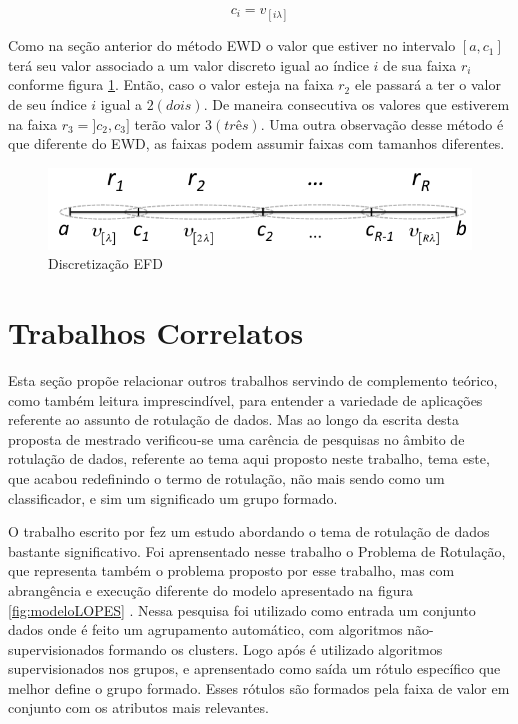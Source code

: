 \begin{equation}
c_i = v_{[i\lambda]}
 \label{eq:pontocorteEFD}
\end{equation}

Como na seção anterior do método EWD o valor que estiver no intervalo ${[a,c_1]}$ terá seu valor associado a um valor discreto igual ao índice ${i}$ de sua faixa ${r_i}$ conforme figura \ref{fig:faixasEFD}. Então, caso o valor esteja na faixa ${r_2}$ ele passará a ter o valor de seu índice ${i}$ igual a ${2(dois)}$. De maneira consecutiva os valores que estiverem na faixa ${r_3=]c_2,c_3]}$ terão valor ${3(três)}$. Uma outra observação desse método é que diferente do EWD, as faixas podem assumir faixas com tamanhos diferentes.

\begin{figure}[h]
        \centering
        \includegraphics[scale=0.6]{figs/discretizacaoEFD.png}
        \caption[Discretização EFD]{Discretização EFD\footnotemark} 
        \label{fig:faixasEFD}
\end{figure} 


\section{Trabalhos Correlatos}\label{cap:refTeor:sec:trabcorrel}

Esta seção propõe relacionar outros trabalhos servindo de complemento teórico, como também leitura imprescindível, para entender a variedade de aplicações referente ao assunto de rotulação de dados. Mas ao longo da escrita desta proposta de mestrado verificou-se uma carência de pesquisas no âmbito de rotulação de dados, referente ao tema aqui proposto neste trabalho, tema este, que acabou redefinindo o termo de rotulação, não mais sendo como um classificador, e sim um significado um grupo formado.

O trabalho escrito por \cite{Lopes} fez um estudo abordando o tema de rotulação de dados bastante significativo. Foi aprensentado nesse trabalho o Problema de Rotulação, que representa também o problema proposto por esse trabalho, mas com abrangência e execução diferente do modelo apresentado na figura \ref{fig:modeloLOPES} . Nessa pesquisa foi utilizado como entrada um conjunto  dados onde é feito um agrupamento automático, com algoritmos não-supervisionados formando os clusters. Logo após é utilizado algoritmos supervisionados nos grupos, e aprensentado como saída um rótulo específico que melhor define o grupo formado. Esses rótulos são formados pela faixa de valor em conjunto com os atributos mais relevantes.


